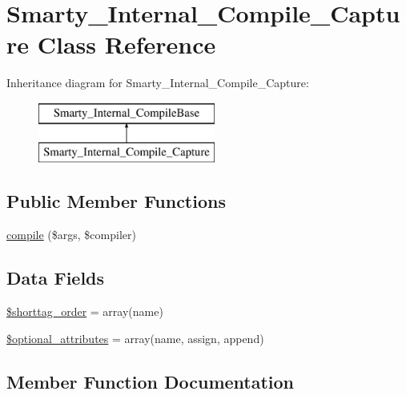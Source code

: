 \hypertarget{class_smarty___internal___compile___capture}{}\section{Smarty\+\_\+\+Internal\+\_\+\+Compile\+\_\+\+Capture Class Reference}
\label{class_smarty___internal___compile___capture}
Inheritance diagram for Smarty\+\_\+\+Internal\+\_\+\+Compile\+\_\+\+Capture\+:\begin{figure}[H]
\begin{center}
\leavevmode
\includegraphics[height=2.000000cm]{class_smarty___internal___compile___capture}
\end{center}
\end{figure}
\subsection*{Public Member Functions}
\begin{DoxyCompactItemize}
\item 
\hyperlink{class_smarty___internal___compile___capture_ad72fac0effa74aadee9b5ef6aed5f69f}{compile} (\$args, \$compiler)
\end{DoxyCompactItemize}
\subsection*{Data Fields}
\begin{DoxyCompactItemize}
\item 
\hyperlink{class_smarty___internal___compile___capture_a2ccb25269c3a92e8c4796c7ef23725e6}{\$shorttag\+\_\+order} = array(\textquotesingle{}name\textquotesingle{})
\item 
\hyperlink{class_smarty___internal___compile___capture_a899d1eb4a6fecbd6ce696adb171c80a4}{\$optional\+\_\+attributes} = array(\textquotesingle{}name\textquotesingle{}, \textquotesingle{}assign\textquotesingle{}, \textquotesingle{}append\textquotesingle{})
\end{DoxyCompactItemize}


\subsection{Member Function Documentation}
\hypertarget{class_smarty___internal___compile___capture_ad72fac0effa74aadee9b5ef6aed5f69f}{}
